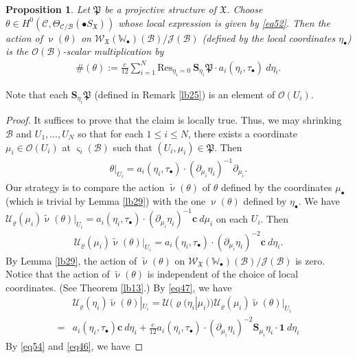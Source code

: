 \documentclass[11pt,b5paper,notitlepage]{article}
\theoremstyle{definition}
\theoremstyle{plain}
\newtheorem{pp}[df]{Proposition}
\newcommand{\fk}{\mathfrak}
\newcommand{\mc}{\mathcal}
\newcommand{\wtd}{\widetilde}
\newcommand{\id}{\mathbf{1}}
\newcommand{\Res}{\mathrm{Res}}
\newcommand{\scr}{\mathscr}
\newcommand{\sgm}{\varsigma}
\newcommand{\SX}{S_{\fk X}}
\newcommand{\blt}{\bullet}
\newcommand{\Wbb}{\mathbb W}
\newcommand{\cbf}{\mathbf c}
\newcommand{\Sbf}{\mathbf{S}}
\numberwithin{equation}{section}
\begin{document}
\begin{pp}\label{lb30}
Let $\fk P$ be a projective structure of $\fk X$. Choose $\theta\in H^0(\mc C,\Theta_{\mc C/\mc B}(\blt\SX))$ whose local expression is given by \eqref{eq52}. Then the action of $\upnu(\theta)$ on $\scr W_{\fk X}(\Wbb_\blt)(\mc B)/\scr J(\mc B)$ (defined by the local coordinates $\eta_\blt$) is the $\scr O(\mc B)$-scalar multiplication  by
	\begin{align}
	\#(\theta):=\frac{c}{12}\sum_{i=1}^N \Res_{\eta_i=0}~ \Sbf_{\eta_i}\fk P\cdot a_i(\eta_i,\tau_\blt)~d\eta_i.\label{eq56}
	\end{align}
\end{pp}
Note that each $\Sbf_{\eta_i}\fk P$ (defined in Remark \ref{lb25}) is an element of $\scr O(U_i)$.


\begin{proof}
	It suffices to prove that the claim is locally true. Thus, we may shrinking $\mc B$ and $U_1,\dots,U_N$ so  that for each $1\leq i\leq N$, there exists a coordinate  $\mu_i\in\scr O(U_i)$ at $\sgm_i(\mc B)$ such that $(U_i,\mu_i)\in\fk P$. Then
	\begin{align*}
	\theta|_{U_i}=a_i(\eta_i,\tau_\blt)\cdot(\partial_{\mu_i}\eta_i)^{-1}\partial_{\mu_i}.
	\end{align*}
	Our strategy is to compare the action $\wtd\upnu(\theta)$ of $\theta$ defined by the coordinates $\mu_\blt$ (which is trivial by Lemma \ref{lb29}) with the one $\upnu(\theta)$ defined by $\eta_\blt$. We have  $\mc U_\varrho(\mu_i)\wtd\upnu(\theta)|_{U_i}=a_i(\eta_i,\tau_\blt)\cdot(\partial_{\mu_i}\eta_i)^{-1}\cbf~d{\mu_i}$ on each $U_i$. Then
	\begin{align*}
	\mc U_\varrho(\mu_i)\wtd\upnu(\theta)|_{U_i}=a_i(\eta_i,\tau_\blt)\cdot(\partial_{\mu_i}\eta_i)^{-2}\cbf~d{\eta_i}.
	\end{align*}
	By Lemma \ref{lb29}, the action of $\wtd\upnu(\theta)$ on $\scr W_{\fk X}(\Wbb_\blt)(\mc B)/\scr J(\mc B)$ is zero. Notice that the action of $\wtd\upnu(\theta)$ is independent of the choice of local coordinates. (See Theorem \ref{lb13}.) By \eqref{eq47}, we have
	\begin{align*}
	&\mc U_\varrho(\eta_i)\wtd\upnu(\theta)|_{U_i}=\mc U(\varrho(\eta_i|\mu_i))\mc U_\varrho(\mu_i)\wtd\upnu(\theta)|_{U_i}\\
	=&a_i(\eta_i,\tau_\blt)\cbf~d{\eta_i}+\frac{c}{12} a_i(\eta_i,\tau_\blt)\cdot(\partial_{\mu_i}\eta_i)^{-2}\Sbf_{\mu_i}\eta_i\cdot \id~d{\eta_i}
	\end{align*}
	By \eqref{eq54} and \eqref{eq46}, we have

\end{proof}
\end{document}
